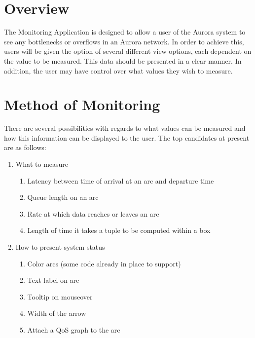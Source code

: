 \documentclass[a4paper,12pt]{article}
\begin{document}
\newcommand{\thisproj}{\bf GUI Monitoring}

\makeatletter                   %
\pagestyle{myheadings}              %
\def\@oddhead{\bf Aurora - \thisproj \hfill (arsinger)} 
\makeatother     

\section*{Overview}

The Monitoring Application is designed to allow a user of the Aurora system to
see any bottlenecks or overflows in an Aurora network. In order to achieve this,
users will be given the option of several different view options, each dependent
on the value to be measured. This data should be presented in a clear manner. In
addition, the user may have control over what values they wish to measure.

\section*{Method of Monitoring}

There are several possibilities with regards to what values can be measured and
how this information can be displayed to the user. The top candidates at present
are as follows:

\begin{enumerate}
\item What to measure
\begin{enumerate}
\item Latency between time of arrival at an arc and departure time
\item Queue length on an arc
\item Rate at which data reaches or leaves an arc
\item Length of time it takes a tuple to be computed within a box
\end{enumerate}
\item How to present system status
\begin{enumerate}
\item Color arcs (some code already in place to support)
\item Text label on arc
\item Tooltip on mouseover
\item Width of the arrow
\item Attach a QoS graph to the arc
\end{enumerate}
\end{enumerate}
\end{document}

